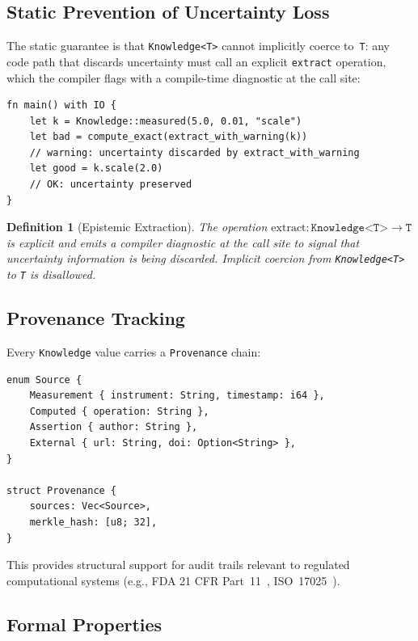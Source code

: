 \documentclass[journal]{IEEEtran}
\newtheorem{definition}{Definition}
\begin{document}
\subsection{Static Prevention of Uncertainty Loss}

The static guarantee is that \texttt{Knowledge<T>} cannot implicitly
coerce to~\texttt{T}: any code path that discards uncertainty must call
an explicit \texttt{extract} operation, which the compiler flags with a
compile-time diagnostic at the call site:

\begin{lstlisting}[caption={Illustrative extraction diagnostic (pseudocode)}]
fn main() with IO {
    let k = Knowledge::measured(5.0, 0.01, "scale")
    let bad = compute_exact(extract_with_warning(k))
    // warning: uncertainty discarded by extract_with_warning
    let good = k.scale(2.0)
    // OK: uncertainty preserved
}
\end{lstlisting}

\begin{definition}[Epistemic Extraction]
The operation $\text{extract}: \texttt{Knowledge<T>} \to \texttt{T}$ is
explicit and emits a compiler diagnostic at the call site to signal that
uncertainty information is being discarded. Implicit coercion from
\texttt{Knowledge<T>} to \texttt{T} is disallowed.
\end{definition}

\subsection{Provenance Tracking}

Every \texttt{Knowledge} value carries a \texttt{Provenance} chain:

\begin{lstlisting}[caption={Provenance structure}]
enum Source {
    Measurement { instrument: String, timestamp: i64 },
    Computed { operation: String },
    Assertion { author: String },
    External { url: String, doi: Option<String> },
}

struct Provenance {
    sources: Vec<Source>,
    merkle_hash: [u8; 32],
}
\end{lstlisting}

This provides structural support for audit trails relevant to regulated
computational systems (e.g., FDA 21 CFR Part~11~\cite{fda21cfr11},
ISO~17025~\cite{iso17025}).

\subsection{Formal Properties}
\end{document}
